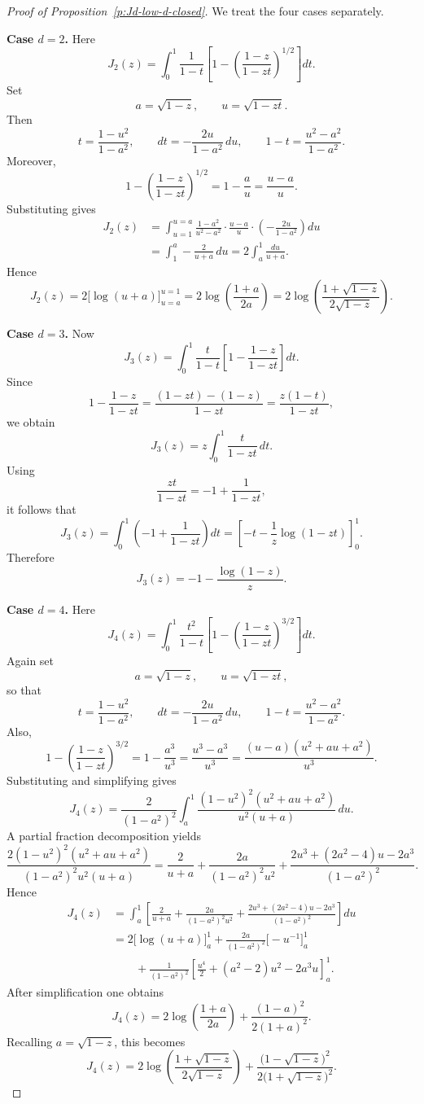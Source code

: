 \documentclass{article}
\begin{document}
\begin{proof}[Proof of Proposition~\ref{p:Jd-low-d-closed}]
We treat the four cases separately.

\textbf{Case \(d=2\).}
Here
\[
J_2(z)=\int_0^1 \frac{1}{1-t}\left[1-\left(\frac{1-z}{1-zt}\right)^{1/2}\right]dt.
\]
Set
\[
a=\sqrt{1-z},\qquad u=\sqrt{1-zt}.
\]
Then
\[
t=\frac{1-u^2}{1-a^2},\qquad
dt=-\frac{2u}{1-a^2}\,du,\qquad
1-t=\frac{u^2-a^2}{1-a^2}.
\]
Moreover,
\[
1-\left(\frac{1-z}{1-zt}\right)^{1/2}
=1-\frac{a}{u}
=\frac{u-a}{u}.
\]
Substituting gives
\begin{align*}
J_2(z)
&=\int_{u=1}^{u=a}
\frac{1-a^2}{u^2-a^2}\cdot \frac{u-a}{u}\cdot\left(-\frac{2u}{1-a^2}\right)du \\
&=\int_1^a -\frac{2}{u+a}\,du
=2\int_a^1 \frac{du}{u+a}.
\end{align*}
Hence
\[
J_2(z)=2\bigl[\log(u+a)\bigr]_{u=a}^{u=1}
=2\log\!\left(\frac{1+a}{2a}\right)
=2\log\!\left(\frac{1+\sqrt{1-z}}{2\sqrt{1-z}}\right).
\]

\textbf{Case \(d=3\).}
Now
\[
J_3(z)=\int_0^1 \frac{t}{1-t}\left[1-\frac{1-z}{1-zt}\right]dt.
\]
Since
\[
1-\frac{1-z}{1-zt}
=\frac{(1-zt)-(1-z)}{1-zt}
=\frac{z(1-t)}{1-zt},
\]
we obtain
\[
J_3(z)=z\int_0^1 \frac{t}{1-zt}\,dt.
\]
Using
\[
\frac{zt}{1-zt}=-1+\frac{1}{1-zt},
\]
it follows that
\[
J_3(z)=\int_0^1\left(-1+\frac{1}{1-zt}\right)dt
=\left[-t-\frac{1}{z}\log(1-zt)\right]_{0}^{1}.
\]
Therefore
\[
J_3(z)=-1-\frac{\log(1-z)}{z}.
\]

\textbf{Case \(d=4\).}
Here
\[
J_4(z)=\int_0^1 \frac{t^2}{1-t}\left[1-\left(\frac{1-z}{1-zt}\right)^{3/2}\right]dt.
\]
Again set
\[
a=\sqrt{1-z},\qquad u=\sqrt{1-zt},
\]
so that
\[
t=\frac{1-u^2}{1-a^2},\qquad
dt=-\frac{2u}{1-a^2}\,du,\qquad
1-t=\frac{u^2-a^2}{1-a^2}.
\]
Also,
\[
1-\left(\frac{1-z}{1-zt}\right)^{3/2}
=1-\frac{a^3}{u^3}
=\frac{u^3-a^3}{u^3}
=\frac{(u-a)(u^2+au+a^2)}{u^3}.
\]
Substituting and simplifying gives
\[
J_4(z)=\frac{2}{(1-a^2)^2}\int_a^1
\frac{(1-u^2)^2(u^2+au+a^2)}{u^2(u+a)}\,du.
\]
A partial fraction decomposition yields
\[
\frac{2(1-u^2)^2(u^2+au+a^2)}{(1-a^2)^2u^2(u+a)}
=
\frac{2}{u+a}
+\frac{2a}{(1-a^2)^2u^2}
+\frac{2u^3+(2a^2-4)u-2a^3}{(1-a^2)^2}.
\]
Hence
\begin{align*}
J_4(z)
&=\int_a^1 \left[
\frac{2}{u+a}
+\frac{2a}{(1-a^2)^2u^2}
+\frac{2u^3+(2a^2-4)u-2a^3}{(1-a^2)^2}
\right]du \\
&=
2\bigl[\log(u+a)\bigr]_a^1
+\frac{2a}{(1-a^2)^2}\bigl[-u^{-1}\bigr]_a^1 \\
&\qquad
+\frac{1}{(1-a^2)^2}
\left[\frac{u^4}{2}+(a^2-2)u^2-2a^3u\right]_a^1.
\end{align*}
After simplification one obtains
\[
J_4(z)=2\log\!\left(\frac{1+a}{2a}\right)+\frac{(1-a)^2}{2(1+a)^2}.
\]
Recalling \(a=\sqrt{1-z}\), this becomes
\[
J_4(z)=2\log\!\left(\frac{1+\sqrt{1-z}}{2\sqrt{1-z}}\right)
+\frac{\bigl(1-\sqrt{1-z}\bigr)^2}{2\bigl(1+\sqrt{1-z}\bigr)^2}.
\]


\end{proof}
\end{document}
